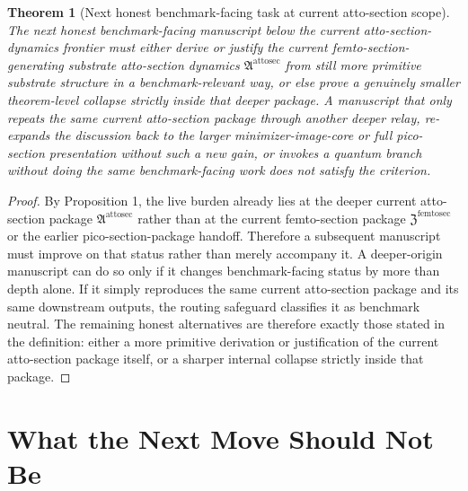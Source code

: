 \documentclass[11pt]{article}
\newcommand{\FemtoSectionPackage}{\mathfrak Z^{\mathrm{femtosec}}}
\newcommand{\AttoSectionPackage}{\mathfrak A^{\mathrm{attosec}}}
\newtheorem{theorem}{Theorem}
\begin{document}
\begin{theorem}[Next honest benchmark-facing task at current atto-section scope]
The next honest benchmark-facing manuscript below the current atto-section-dynamics frontier must either derive or justify the current femto-section-generating substrate atto-section dynamics \(\AttoSectionPackage\) from still more primitive substrate structure in a benchmark-relevant way, or else prove a genuinely smaller theorem-level collapse strictly inside that deeper package. A manuscript that only repeats the same current atto-section package through another deeper relay, re-expands the discussion back to the larger minimizer-image-core or full pico-section presentation without such a new gain, or invokes a quantum branch without doing the same benchmark-facing work does not satisfy the criterion.
\end{theorem}

\begin{proof}
By Proposition 1, the live burden already lies at the deeper current atto-section package \(\AttoSectionPackage\) rather than at the current femto-section package \(\FemtoSectionPackage\) or the earlier pico-section-package handoff. Therefore a subsequent manuscript must improve on that status rather than merely accompany it. A deeper-origin manuscript can do so only if it changes benchmark-facing status by more than depth alone. If it simply reproduces the same current atto-section package and its same downstream outputs, the routing safeguard classifies it as benchmark neutral. The remaining honest alternatives are therefore exactly those stated in the definition: either a more primitive derivation or justification of the current atto-section package itself, or a sharper internal collapse strictly inside that package.
\end{proof}

\section{What the Next Move Should Not Be}
\end{document}
